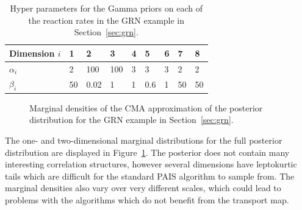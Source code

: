 \documentclass[final]{siamltex}
\begin{document}
\begin{table}[!h]
\centering
\begin{tabular}{|l|R{1.8em}|R{1.8em}|R{1.8em}|R{1.8em}|R{1.8em}|R{1.8em}|R{1.8em}|R{1.8em}|}
	\hline
	Dimension $i$ & 1 & 2& 3& 4 & 5 & 6 & 7 & 8 \\ \hline
	$\alpha_i$ & 2 & 100 & 100 & 3 & 3 & 3 & 2 & 2\\ \hline
	$\beta_i$ &50 & 0.02 & 1 & 1 & 0.6 & 1 & 50 & 50 \\ \hline
\end{tabular}
\caption{Hyper parameters for the Gamma priors on each of the reaction rates in the GRN example in Section~\ref{sec:grn}.}
\label{tab:grn_priors}
\end{table}

\begin{figure}[htb]
\centering
{}%
\caption{Marginal densities of the CMA approximation of the posterior
  distribution for the GRN example in Section~\ref{sec:grn}.}
\label{fig:GRN_posterior}
\end{figure}

The one- and two-dimensional marginal distributions for the full
posterior distribution are displayed in
Figure~\ref{fig:GRN_posterior}. The posterior does not contain many
interesting correlation structures, however several dimensions have
leptokurtic tails which are difficult for the standard PAIS algorithm
to sample from. The marginal densities also vary over very different
scales, which could lead to problems with the algorithms which do not
benefit from the transport map.
\end{document}
